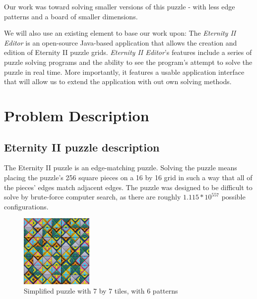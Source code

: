 \documentclass{llncs}
\begin{document}

Our work was toward solving smaller versions of this puzzle - with less edge patterns and a board of smaller dimensions.




We will also use an existing element to base our work upon: The \textit{Eternity II Editor} is an open-source Java-based application that allows the creation and edition of Eternity II puzzle grids. \textit{Eternity II Editor}'s features include a series of puzzle solving programs and the ability to see the program's attempt to solve the puzzle in real time. More importantly, it features a usable application interface that will allow us to extend the application with out own solving methods.

\section{Problem Description}\label{sec:problem_description}

\subsection{Eternity II puzzle description}\label{sec:puzzle_description}

The Eternity II puzzle is an edge-matching puzzle. Solving the puzzle means placing the puzzle's 256 square pieces on a 16 by 16  grid in such a way that all of the pieces' edges match adjacent edges. The puzzle was designed to be difficult to solve by brute-force computer search, as there are roughly $1.115 * 10 ^ {557}$ possible configurations.

\begin{figure}[h]
	\centering
	\includegraphics[width=35mm]{images/shuffled.png}
	\caption{Simplified puzzle with 7 by 7 tiles, with 6 patterns}
	\label{fig:shuffled_example}
\end{figure}
\end{document}
